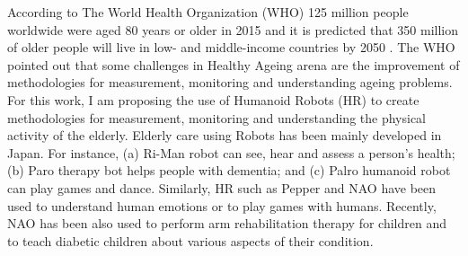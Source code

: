 \documentclass[12pt,journal,onecolumn,compsoc]{IEEEtran}
\begin{document}
According to The World Health Organization (WHO) 125 million people worldwide were aged 80 years or older in 2015
and it is predicted that 350 million of older people will live in low- and middle-income countries by 2050 \cite{AH16}. 
The WHO pointed out that
some
challenges in Healthy Ageing arena 
are 
the improvement of methodologies for measurement, monitoring and understanding ageing problems.
For this work,
I am proposing the use of Humanoid Robots (HR) to 
create methodologies for measurement, monitoring and understanding the physical activity of the elderly.
Elderly care using Robots has been mainly developed in Japan. For instance,
(a) Ri-Man robot can see, hear and assess a person's health; (b) Paro therapy bot helps people with dementia; and 
(c) Palro humanoid robot can play games and dance.
Similarly,
HR such as Pepper and NAO have been used 
to understand human emotions or to play games with humans.
Recently, NAO has been also used 
to perform arm rehabilitation therapy for children and 
to teach diabetic children about various aspects of their condition.
\end{document}
